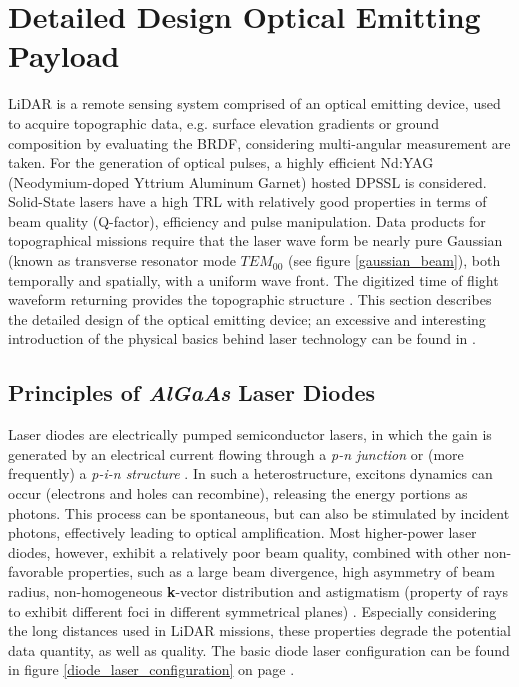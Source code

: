 \section{Detailed Design Optical Emitting Payload} 
\label{sec:DDlaser}
\acs{LiDAR} is a remote sensing system comprised of an optical emitting device, used to acquire topographic data, e.g. surface elevation gradients or ground composition by evaluating the \acs{BRDF}, considering multi-angular measurement are taken. For the generation of optical pulses, a highly efficient Nd:YAG (Neodymium-doped Yttrium Aluminum Garnet) hosted \ac{DPSSL}  is considered. Solid-State \acp{laser} have a high \acs{TRL} with relatively good properties in terms of beam quality (Q-factor), efficiency and pulse manipulation. Data products for topographical missions require that the \ac{laser} wave form be nearly pure Gaussian (known as transverse resonator mode $TEM_{00}$ (see figure \ref{gaussian_beam}), both temporally and spatially, with a uniform wave front. The digitized time of flight waveform returning provides the topographic structure \cite{nd_yag_life}. This section describes the detailed design of the optical emitting device; an excessive and interesting introduction of the physical basics behind \acs{laser} technology can be found in \cite{laserfundamentals}. 

\subsection{Principles of \textit{AlGaAs} Laser Diodes}
\label{laser_diodes}
Laser diodes are electrically pumped semiconductor \acp{laser}, in which the gain is generated by an electrical current flowing through a \textit{p-n junction} or (more frequently) a \textit{p-i-n structure} \cite{lasertech}. In such a heterostructure, excitons dynamics can occur (electrons and holes can recombine), releasing the energy portions as photons. This process can be spontaneous, but can also be stimulated by incident photons, effectively leading to optical amplification. Most higher-power \acs{laser} diodes, however, exhibit a relatively poor beam quality, combined with other non-favorable properties, such as a large beam divergence, high asymmetry of beam radius, non-homogeneous \textbf{k}-vector distribution and astigmatism (property of rays to exhibit different foci in different symmetrical planes) \cite{lasertech}. Especially considering the long distances used in \acs{LiDAR} missions, these properties degrade the potential data quantity, as well as quality. The basic diode \acs{laser} configuration can be found in figure \ref{diode_laser_configuration} on page \pageref{diode_laser_configuration}.

